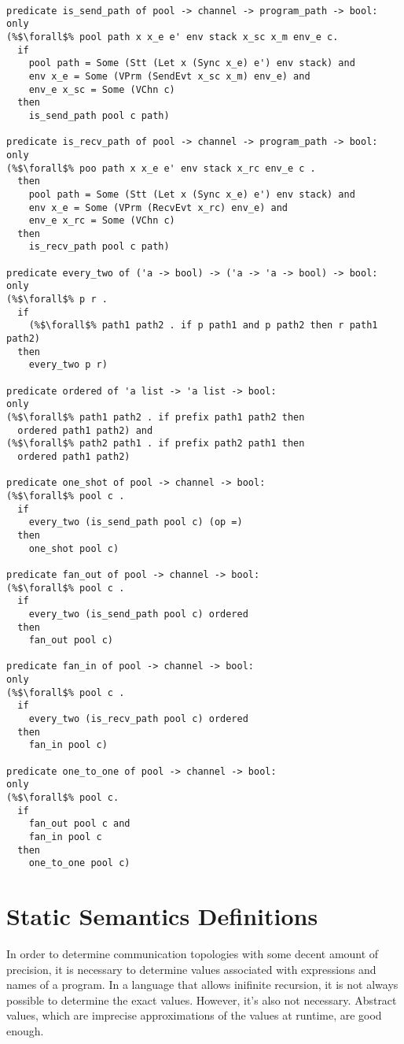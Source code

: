 \documentclass{article}
\begin{document}
\begin{lstlisting}[language=logic, escapechar=\%]

predicate is_send_path of pool -> channel -> program_path -> bool:
only
(%$\forall$% pool path x x_e e' env stack x_sc x_m env_e c.
  if
    pool path = Some (Stt (Let x (Sync x_e) e') env stack) and
    env x_e = Some (VPrm (SendEvt x_sc x_m) env_e) and 
    env_e x_sc = Some (VChn c)
  then
    is_send_path pool c path)

predicate is_recv_path of pool -> channel -> program_path -> bool:
only
(%$\forall$% poo path x x_e e' env stack x_rc env_e c .
  then
    pool path = Some (Stt (Let x (Sync x_e) e') env stack) and
    env x_e = Some (VPrm (RecvEvt x_rc) env_e) and
    env_e x_rc = Some (VChn c)
  then
    is_recv_path pool c path)

predicate every_two of ('a -> bool) -> ('a -> 'a -> bool) -> bool:
only
(%$\forall$% p r .
  if
    (%$\forall$% path1 path2 . if p path1 and p path2 then r path1 path2)
  then
    every_two p r)

predicate ordered of 'a list -> 'a list -> bool:
only
(%$\forall$% path1 path2 . if prefix path1 path2 then
  ordered path1 path2) and
(%$\forall$% path2 path1 . if prefix path2 path1 then
  ordered path1 path2)

predicate one_shot of pool -> channel -> bool:
(%$\forall$% pool c .
  if
    every_two (is_send_path pool c) (op =)
  then
    one_shot pool c)

predicate fan_out of pool -> channel -> bool:
(%$\forall$% pool c .
  if
    every_two (is_send_path pool c) ordered
  then
    fan_out pool c)
  
predicate fan_in of pool -> channel -> bool:
only
(%$\forall$% pool c .
  if
    every_two (is_recv_path pool c) ordered
  then
    fan_in pool c)

predicate one_to_one of pool -> channel -> bool:
only
(%$\forall$% pool c.
  if
    fan_out pool c and 
    fan_in pool c
  then
    one_to_one pool c)

\end{lstlisting}

\section{Static Semantics Definitions}

In order to determine communication topologies with some decent amount of precision, it is
necessary to determine values associated with expressions and names of a program.  In a
language that allows inifinite recursion, it is not always possible to determine the exact
values.  However, it's also not necessary.  Abstract values, which are imprecise approximations
of the values at runtime, are good enough.
\end{document}

